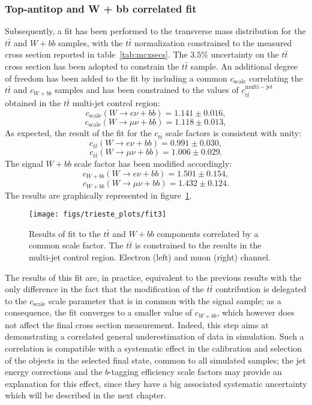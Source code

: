 \subsubsection{Top-antitop and W + bb correlated fit}
Subsequently, a fit has been performed to the 
transverse mass distribution for the $t\bar{t}$ and $W + bb$ 
samples, with the $t\bar{t}$ normalization constrained to the 
measured cross section reported in table~\ref{tab:mcxsecs}.
The $3.5\%$ uncertainty on the $t\bar{t}$ cross section has been
adopted to constrain the $t\bar{t}$ sample.
An additional degree of freedom has been added to the fit by 
including a common $c_{\mathrm{scale}}$ correlating the $t\bar{t}$ and 
$c_{W+bb}$ samples and has been constrained to the 
values of $c_{t\bar{t}}^{\mathrm{multi-jet}}$ obtained in the 
$t\bar{t}$ multi-jet control region:
$$c_{\mathrm{scale}}(W \rightarrow e \nu + bb) = 1.141 \pm 0.016 \mathrm{,}$$
$$c_{\mathrm{scale}}(W \rightarrow \mu \nu + bb) = 1.118 \pm 0.013 \mathrm{,}$$
As expected, the result of the fit for the $c_{t\bar{t}}$
scale factors is consistent with unity:
$$c_{t\bar{t}}(W \rightarrow e \nu + bb) = 0.991 \pm 0.030 \mathrm{,}$$
$$c_{t\bar{t}}(W \rightarrow \mu \nu + bb) = 1.006 \pm 0.029 \mathrm{.}$$
The signal $W+bb$ scale factor has been modified accordingly:
$$c_{W+bb}(W \rightarrow e \nu + bb) = 1.501 \pm 0.154 \mathrm{,}$$
$$c_{W+bb}(W \rightarrow \mu \nu + bb) = 1.432 \pm 0.124 \mathrm{.}$$
The results are graphically represented in figure~\ref{fig:intermediatefit2}.
\begin{figure}[htb]
	\begin{center}
		\leavevmode
		\texttt{[image: figs/trieste\_plots/fit3]}
	\end{center}
	\caption{Results of fit to the $t\bar{t}$ and $W+bb$ components correlated by 
          a common scale factor. The $t\bar{t}$ is constrained to the results 
          in the multi-jet control region. Electron (left) and 
          muon (right) channel.}
	\label{fig:intermediatefit2}
\end{figure}
The results of this fit are, in practice, equivalent to the previous results 
with the only difference in the fact that the modification of the $t\bar{t}$
contribution is delegated to the $c_{\mathrm{scale}}$ scale parameter that 
is in common with the signal sample; as a consequence, the fit converges to a 
smaller value of $c_{W+bb}$, which however does not affect the final cross section 
measurement.
Indeed, this step aims at demonstrating a correlated general underestimation of data 
in simulation. Such a correlation is compatible with a systematic effect in the calibration 
and selection of the objects in the selected final state, common to all simulated
samples; the jet energy corrections and the $b$-tagging efficiency scale factors
may provide an explanation for this effect, since they have a big associated 
systematic uncertainty which will be described in the next chapter.

